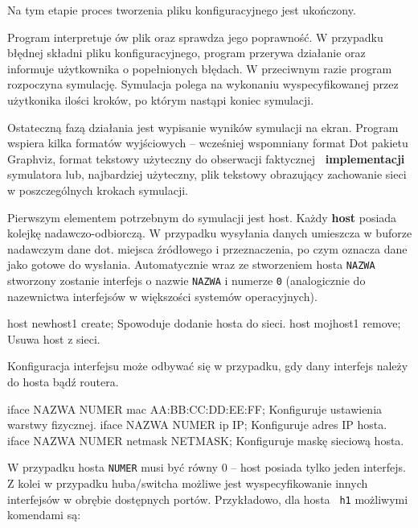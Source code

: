 Na tym etapie proces tworzenia pliku konfiguracyjnego jest ukończony.

Program interpretuje ów plik oraz sprawdza jego poprawność. W przypadku
błędnej składni pliku konfiguracyjnego, program przerywa działanie oraz
informuje użytkownika o popełnionych błędach. W przeciwnym razie program
rozpoczyna symulację. Symulacja polega na wykonaniu wyspecyfikowanej przez
użytkonika ilości kroków, po którym nastąpi koniec symulacji.

Ostateczną fazą działania jest wypisanie wyników symulacji na ekran. Program
wspiera kilka formatów wyjściowych -- wcześniej wspomniany format Dot
pakietu Graphviz, format tekstowy użyteczny do obserwacji faktycznej
{\bf~implementacji} symulatora lub, najbardziej użyteczny, plik tekstowy
obrazujący zachowanie sieci w poszczególnych krokach symulacji.


\noindent
Pierwszym elementem potrzebnym do symulacji jest host.  Każdy {\bf host}
posiada kolejkę nadawczo-odbiorczą. W przypadku wysyłania danych umieszcza w
buforze nadawczym dane dot. miejsca źródłowego i przeznaczenia, po czym
oznacza dane jako gotowe do wysłania. Automatycznie wraz ze stworzeniem
hosta {\tt NAZWA} stworzony zostanie interfejs o nazwie {\tt NAZWA} i
numerze {\tt 0} (analogicznie do nazewnictwa interfejsów w większości
systemów operacyjnych).

\smallskip
{}
\smallskip

\mytt host newhost1 create; Spowoduje dodanie hosta do sieci.
\mytt host mojhost1 remove; Usuwa host z sieci.

\noindent
Konfiguracja interfejsu może odbywać się w przypadku, gdy dany interfejs
należy do hosta bądź routera.

\mytt iface NAZWA NUMER mac AA:BB:CC:DD:EE:FF; Konfiguruje ustawienia warstwy fizycznej.
\mytt iface NAZWA NUMER ip IP; Konfiguruje adres IP hosta.
\mytt iface NAZWA NUMER netmask NETMASK; Konfiguruje maskę sieciową hosta.

W przypadku hosta {\tt NUMER} musi być równy 0 -- host posiada tylko jeden
interfejs. Z kolei w przypadku huba/switcha możliwe jest wyspecyfikowanie
innych interfejsów w obrębie dostępnych portów.  Przykładowo, dla hosta {\tt
h1} możliwymi komendami są:

